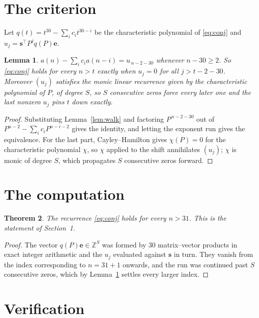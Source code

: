 \documentclass[11pt,a4paper]{article}
\theoremstyle{plain}
\newtheorem{theorem}{Theorem}
\newtheorem{lemma}[theorem]{Lemma}
\theoremstyle{definition}
\begin{document}
\section{The criterion}

Let $q(t)=t^{30}-\sum_i c_i t^{30-i}$ be the characteristic polynomial of
\eqref{eq:conj} and $u_j=\mathbf{s}^{\!\top}P^{j}q(P)\mathbf{e}$.

\begin{lemma}\label{lem:crit}
$a(n)-\sum_i c_i a(n-i)=u_{\,n-2-30}$ whenever $n-30\ge2$. So \eqref{eq:conj}
holds for every $n>t$ exactly when $u_j=0$ for all $j>t-2-30$. Moreover $(u_j)$
satisfies the monic linear recurrence given by the characteristic polynomial of $P$, of
degree $S$, so $S$ consecutive zeros force every later one and the last nonzero $u_j$ pins
$t$ down exactly.
\end{lemma}

\begin{proof}
Substituting Lemma~\ref{lem:walk} and factoring $P^{\,n-2-30}$ out of
$P^{n-2}-\sum_i c_i P^{n-i-2}$ gives the identity, and letting the exponent run gives the
equivalence. For the last part, Cayley--Hamilton gives $\chi(P)=0$ for the characteristic
polynomial $\chi$, so $\chi$ applied to the shift annihilates $(u_j)$; $\chi$ is monic of
degree $S$, which propagates $S$ consecutive zeros forward.
\end{proof}

\section{The computation}

\begin{theorem}
The recurrence \eqref{eq:conj} holds for every $n>31$. This is the statement of
Section~1.
\end{theorem}

\begin{proof}
The vector $q(P)\mathbf{e}\in\mathbb{Z}^{S}$ was formed by $30$ matrix--vector
products in exact integer arithmetic and the $u_j$ evaluated against $\mathbf{s}$ in turn.
They vanish from the index corresponding to $n=31+1$ onwards, and the run was continued
past $S$ consecutive zeros, which by Lemma~\ref{lem:crit} settles every larger index.
\end{proof}

\section{Verification}
\end{document}
